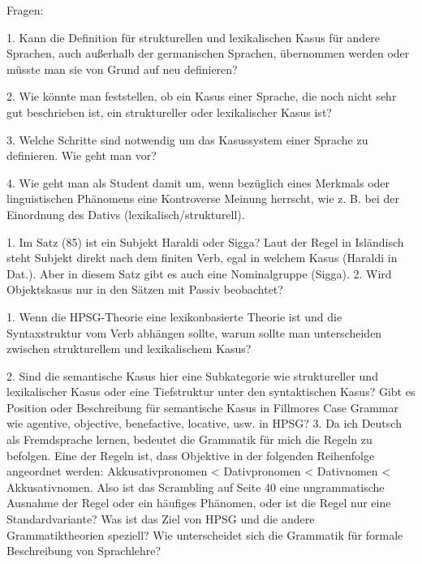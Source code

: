 














Fragen:

1. Kann die Definition für strukturellen und lexikalischen Kasus für andere Sprachen, auch außerhalb der germanischen Sprachen, übernommen werden oder müsste man sie von Grund auf neu definieren? 

2. Wie könnte man feststellen, ob ein Kasus einer Sprache, die noch nicht sehr gut beschrieben ist, ein struktureller oder lexikalischer Kasus ist? 

3. Welche Schritte sind notwendig um das Kasussystem einer Sprache zu definieren. Wie geht man vor? 

4. Wie geht man als Student damit um, wenn bezüglich eines Merkmals oder linguistischen Phänomens eine Kontroverse Meinung herrscht, wie z. B. bei der Einordnung des Dativs (lexikalisch/strukturell).




1.	Im Satz (85) ist ein Subjekt Haraldi oder Sigga?
Laut der Regel in Isländisch steht Subjekt direkt nach dem finiten Verb, egal in welchem Kasus (Haraldi in Dat.). Aber in diesem Satz gibt es auch eine Nominalgruppe  (Sigga).
2.	Wird Objektskasus nur in den Sätzen mit Passiv beobachtet?
  



1. Wenn die HPSG-Theorie eine lexikonbasierte Theorie ist und die
Syntaxstruktur vom Verb abhängen sollte, warum sollte man unterscheiden
zwischen strukturellem und lexikalischem Kasus?

2. Sind die semantische Kasus hier eine Subkategorie wie struktureller und
lexikalischer Kasus oder eine Tiefstruktur unter den syntaktischen Kasus?
Gibt es Position oder Beschreibung für semantische Kasus in Fillmores Case
Grammar wie agentive, objective, benefactive, locative, usw. in HPSG? 3.
Da ich Deutsch als Fremdsprache lernen, bedeutet die Grammatik für mich
die Regeln zu befolgen. Eine der Regeln ist, dass Objektive in der
folgenden Reihenfolge angeordnet werden: Akkusativpronomen < Dativpronomen
< Dativnomen < Akkusativnomen.
Also ist das Scrambling auf Seite 40 eine ungrammatische Ausnahme der
Regel oder ein häufiges Phänomen, oder ist die Regel nur eine
Standardvariante? Was ist das Ziel von HPSG und die andere
Grammatiktheorien speziell? Wie unterscheidet sich die Grammatik für
formale Beschreibung von Sprachlehre?

